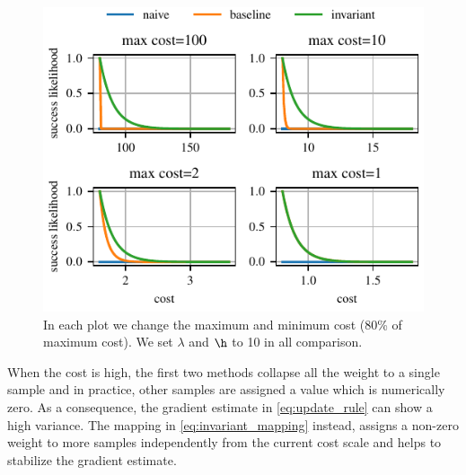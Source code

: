 \begin{figure}[t]
    \centering
    \includegraphics{figures/likelihood_mapping.pdf}
    \caption{In each plot we change the maximum and minimum cost ($80$\% of maximum cost). We set $\lambda$ and $\h$ to 10 in all comparison.}
    \label{fig:exponential_mapping_comparison}
\end{figure}

When the cost is high, the first two methods collapse all the weight to a single sample and in practice, other samples are assigned a value which is numerically zero. As a consequence, the gradient estimate in \eqref{eq:update_rule} can show a high variance. The mapping in \eqref{eq:invariant_mapping} instead, assigns a non-zero weight to more samples independently from the current cost scale and helps to stabilize the gradient estimate.

